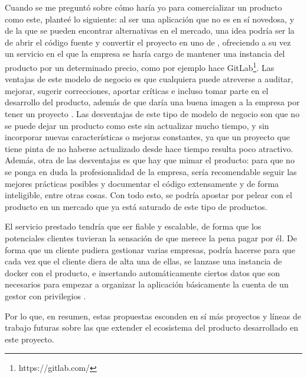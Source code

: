 Cuando se me preguntó sobre cómo haría yo para comercializar un producto
como este, planteé lo siguiente: al ser una aplicación que no es en sí novedosa,
y de la que se pueden encontrar alternativas en el mercado, una idea podría ser
la de abrir el código fuente y convertir el proyecto en uno de
, ofreciendo a su vez un servicio en el que
la empresa se haría cargo de mantener una instancia del producto por un determinado
precio, como por ejemplo hace GitLab\footnote{https://gitlab.com/}. Las ventajas
de este modelo de negocio es que cualquiera puede atreverse a auditar, mejorar,
sugerir correcciones, aportar críticas e incluso tomar parte en el desarrollo
del producto, además de que daría una buena imagen a la empresa por tener un proyecto
. Las desventajas de este tipo de modelo de negocio
son que no se puede dejar un producto como este sin actualizar mucho tiempo, y sin
incorporar nuevas características o mejoras constantes, ya que un proyecto que tiene
pinta de no haberse actualizado desde hace tiempo resulta poco atractivo. Además, otra
de las desventajas es que hay que mimar el producto: para que no se ponga en duda
la profesionalidad de la empresa, sería recomendable seguir las mejores prácticas posibles y
documentar el código extensamente y de forma inteligible, entre otras cosas. Con todo esto,
se podría apostar por pelear con el producto en un mercado que ya está saturado de este
tipo de productos.

El servicio prestado tendría que ser fiable y escalable, de forma que los potenciales
clientes tuvieran la sensación de que merece la pena pagar por él. De forma que un
cliente pudiera gestionar varias empresas, podría hacerse para que cada vez que el
cliente diera de alta una de ellas, se lanzase una instancia de \gls{docker} con
el producto, e insertando automáticamente ciertos datos que son necesarios para empezar
a organizar la aplicación \textemdash básicamente la cuenta de un gestor con privilegios
\textemdash.

Por lo que, en resumen, estas propuestas esconden en sí más proyectos y líneas de trabajo
futuras sobre las que extender el ecosistema del producto desarrollado en este proyecto.
